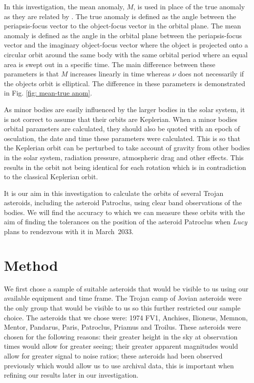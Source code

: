 \documentclass[10pt, twocolumn]{revtex4}    %
\begin{document}
In this investigation, the mean anomaly, $M$, is used in place of the true anomaly as they are related by . The true anomaly is defined as the angle between the periapsis-focus vector to the object-focus vector in the orbital plane. The mean anomaly is defined as the angle in the orbital plane between the periapsis-focus vector and the imaginary object-focus vector where the object is projected onto a circular orbit around the same body with the same orbital period where an equal area is swept out in a specific time. The main difference between these parameters is that $M$ increases linearly in time whereas $\nu$ does not necessarily if the objects orbit is elliptical. The difference in these parameters is demonstrated in Fig. \ref{fig: mean-true anom}.

As minor bodies are easily influenced by the larger bodies in the solar system, it is not correct to assume that their orbits are Keplerian. When a minor bodies orbital parameters are calculated, they should also be quoted with an epoch of osculation, the date and time these parameters were calculated. This is so that the Keplerian orbit can be perturbed to take account of gravity from other bodies in the solar system, radiation pressure, atmospheric drag and other effects. This results in the orbit not being identical for each rotation which is in contradiction to the classical Keplerian orbit.

It is our aim in this investigation to calculate the orbits of several Trojan asteroids, including the asteroid Patroclus, using clear band observations of the bodies. We will find the accuracy to which we can measure these orbits with the aim of finding the tolerances on the position of the asteroid Patroclus when \textit{Lucy} plans to rendezvous with it in March~2033.

\section{Method}

We first chose a sample of suitable asteroids that would be visible to us using our available equipment and time frame. The Trojan camp of Jovian asteroids were the only group that would be visible to us so this further restricted our sample choice. The asteroids that we chose were: 1974 FV1, Anchises, Ilioneus, Memnon, Mentor, Pandarus, Paris, Patroclus, Priamus and Troilus. These asteroids were chosen for the following reasons: their greater height in the sky at observation times would allow for greater seeing; their greater apparent magnitudes would allow for greater signal to noise ratios; these asteroids had been observed previously which would allow us to use archival data, this is important when refining our results later in our investigation.
\end{document}
